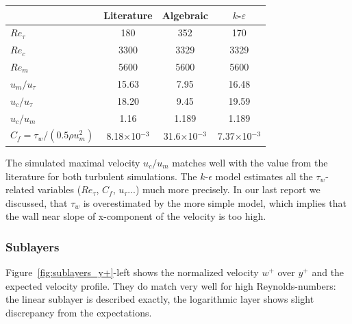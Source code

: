 \begin{center}
\begin{tabular}{lccc}
\hline
 & Literature & Algebraic & $k$-$\varepsilon$ \\\hline
$Re_\tau$ & 180 & 352 & 170 \\
$Re_c$ & 3300 & 3329 &  3329 \\
$Re_m$ & 5600 & 5600 & 5600 \\
$u_m/u_\tau$ & 15.63 & 7.95 & 16.48 \\
$u_c/u_\tau$ & 18.20 & 9.45 & 19.59 \\
$u_c/u_m$ & 1.16 & 1.189 & 1.189 \\
$C_f = \tau_w / (0.5 \rho u_m^2)$ & 8.18$\times$10$^{-3}$ & 31.6$\times$10$^{-3}$ & 7.37$\times$10$^{-3}$ \\\hline
\end{tabular}
\end{center}

\noindent The simulated maximal velocity $u_c/u_m$ matches well with the value from the literature for both turbulent simulations. The $k$-$\epsilon$ model estimates all the $\tau_w$-related variables ($Re_\tau$, $C_f$, $u_\tau$...) much more precisely. In our last report \citep{lienen2015} we discussed, that $\tau_w$  is overestimated by the more simple model, which implies that the wall near slope of x-component of the velocity is too high.

\subsubsection*{Sublayers}\label{ssub:sublayers}

Figure~\ref{fig:sublayers_y+}-left shows the normalized velocity $w^+$  over $y^+$ and the expected velocity profile. They do match very well for high Reynolds-numbers: the linear sublayer is described exactly, the logarithmic layer shows slight discrepancy from the expectations.

